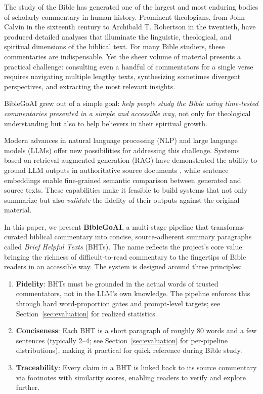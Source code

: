 The study of the Bible has generated one of the largest and most enduring bodies of scholarly commentary in human history. Prominent theologians, from John Calvin in the sixteenth century to Archibald T. Robertson in the twentieth, have produced detailed analyses that illuminate the linguistic, theological, and spiritual dimensions of the biblical text. For many Bible studiers, these commentaries are indispensable. Yet the sheer volume of material presents a practical challenge: consulting even a handful of commentators for a single verse requires navigating multiple lengthy texts, synthesizing sometimes divergent perspectives, and extracting the most relevant insights.

BibleGoAI grew out of a simple goal: \textit{help people study the Bible using time-tested commentaries presented in a simple and accessible way}, not only for theological understanding but also to help believers in their spiritual growth.

Modern advances in natural language processing (NLP) and large language models (LLMs) offer new possibilities for addressing this challenge. Systems based on retrieval-augmented generation (RAG) have demonstrated the ability to ground LLM outputs in authoritative source documents \citep{lewis2020rag}, while sentence embeddings \citep{cer2018use, reimers2019sentencebert} enable fine-grained semantic comparison between generated and source texts. These capabilities make it feasible to build systems that not only summarize but also \textit{validate} the fidelity of their outputs against the original material.

In this paper, we present \textbf{BibleGoAI}, a multi-stage pipeline that transforms curated biblical commentary into concise, source-adherent summary paragraphs called \textit{Brief Helpful Texts} (BHTs). The name reflects the project's core value: bringing the richness of difficult-to-read commentary to the fingertips of Bible readers in an accessible way. The system is designed around three principles:

\begin{enumerate}[nosep,leftmargin=*]
    \item \textbf{Fidelity}: BHTs must be grounded in the actual words of trusted commentators, not in the LLM's own knowledge. The pipeline enforces this through hard word-proportion gates and prompt-level targets; see Section~\ref{sec:evaluation} for realized statistics.
    \item \textbf{Conciseness}: Each BHT is a short paragraph of roughly 80 words and a few sentences (typically 2--4; see Section~\ref{sec:evaluation} for per-pipeline distributions), making it practical for quick reference during Bible study.
    \item \textbf{Traceability}: Every claim in a BHT is linked back to its source commentary via footnotes with similarity scores, enabling readers to verify and explore further.
\end{enumerate}

